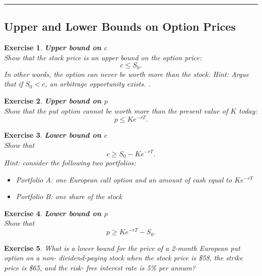\documentclass[letterpaper,10pt]{article}
\newtheorem{ex}{Exercise}
\begin{document}
\begin{itemize}
\end{itemize}

\bigskip

\hrule

\bigskip

\subsection{Upper and Lower Bounds on Option Prices}



\begin{ex}{\bf Upper bound on $c$}\\
Show that the stock price is an upper bound on the option price:  $$c\leq S_0.$$  In other words, the option can never be worth more than the stock.
Hint:  Argue that if $S_0<c$, an arbitrage opportunity exists. 
.
\end{ex}



\begin{ex}{\bf Upper bound on $p$}\\
Show that the put option cannot be worth more than the present value of $K$ today:  $$p\leq Ke^{-rT}.$$  

\end{ex}



\begin{ex}{\bf Lower bound on $c$}\\
Show that $$c\geq S_0-Ke^{-rT}.$$  Hint: consider the following two portfolios:  

\begin{itemize}

\item Portfolio A:  one European call option and an amount of cash equal to $Ke^{-rT}$

\item Portfolio B:  one share of the stock

\end{itemize}




\end{ex}



\begin{ex}{\bf Lower bound on $p$}\\
Show that $$p\geq Ke^{-rT}-S_0.$$   
\end{ex}



\begin{ex}
What is a lower bound for the price of a 2-month European put option on a non- dividend-paying stock when the stock price is \$58, the strike price is \$65, and the risk- free interest rate is 5\% per annum?
\end{ex}
\end{document}

